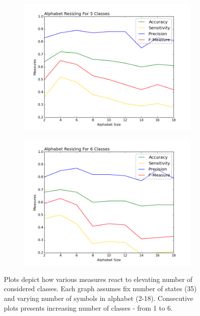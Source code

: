 \documentclass{mini}
\begin{document}
\begin{figure}
\begin{subfigure}{.5\textwidth}
  \includegraphics[width=1\linewidth]{images/a_c5_fig.png}
  \label{fig:sfig1}
\end{subfigure}%
\begin{subfigure}{.5\textwidth}
  \centering
  \includegraphics[width=1\linewidth]{images/a_c6_fig.png}
  \label{fig:sfig2}
\end{subfigure}
\caption{Plots depict how various measures react to elevating number of considered classes. Each graph assumes fix number of states (35) and varying number of symbols in alphabet (2-18). Consecutive plots presents increasing number of classes - from 1 to 6.}
\label{fig:fig}
\end{figure}

\appendix\label{appendix_a}
\end{document}

